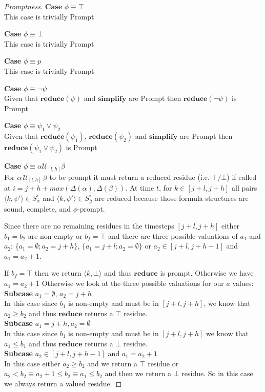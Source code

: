 \documentclass[10pt,a4paper]{article}
\newcommand{\rp}[2]{\ensuremath{\langle #1, #2 \rangle}}
\begin{document}
\begin{proof}[Promptness]

\noindent \textbf{Case} $\phi \equiv \top$ \\
This case is trivially Prompt

\noindent \textbf{Case} $\phi \equiv \bot$ \\
This case is trivially Prompt

\noindent \textbf{Case} $\phi \equiv p$ \\
This case is trivially Prompt

\noindent \textbf{Case} $\phi \equiv \neg \psi$ \\
Given that $\mathbf{reduce}(\psi)$ and $\mathbf{simplify}$ are Prompt then $\mathbf{reduce}(\neg \psi)$ is Prompt

\noindent \textbf{Case} $\phi \equiv \psi_1 \vee \psi_2$ \\
Given that $\mathbf{reduce}(\psi_1)$, $\mathbf{reduce}(\psi_2)$ and $\mathbf{simplify}$ are Prompt then $\mathbf{reduce}(\psi_1 \vee \psi_2)$ is Prompt

\noindent \textbf{Case} $\phi \equiv \alpha \mathcal{U}_{[l,h]} \beta$ \\
For $\alpha\, \mathcal{U}_{[l,h]}\, \beta$ to be prompt it must return a reduced residue (i.e. $\top/\bot$) if called at $i = j + h + max(\Delta(\alpha),\Delta(\beta))$. At time $t$, for $k \in [j+l,j+h]$ all pairs $\rp{k}{\psi'} \in S^i_{\alpha}$ and $\rp{k}{\psi'} \in S^i_\beta$ are reduced because those formula structures are sound, complete, and $\phi$-prompt.

Since there are no remaining residues in the timesteps $[j+l,j+h]$ either $b_1 = b_2$ are non-empty or $b_f = \top$ and there are three possible valuations of $a_1$ and $a_2$: \{$a_1 = \emptyset; a_2 = j+h\}$, $\{a_1 = j+l; a_2 = \emptyset\}$ or $a_2 \in [j+l,j+h-1]$ and $a_1 = a_2 + 1$.

If $b_f = \top$ then we return $\rp{k}{\bot}$ and thus $\mathbf{reduce}$ is prompt. Otherwise we have $a_1 = a_2+1$
Otherwise we look at the three possible valuations for our $a$ values: \\
\textbf{Subcase} $a_1 = \emptyset$, $a_2 = j+h$ \\
In this case since $b_1$ is non-empty and must be in $[j+l,j+h]$, we know that $a_2 \geq b_2$ and thus $\mathbf{reduce}$ returns a $\top$ residue. \\
\textbf{Subcase} $a_1 = j+h, a_2 = \emptyset$ \\
In this case since $b_1$ is non-empty and must be in $[j+l,j+h]$ we know that $a_1 \leq b_1$ and thus $\mathbf{reduce}$ returns a $\bot$ residue. \\
\textbf{Subcase} $a_2 \in [j+l,j+h-1]$ and $a_1 = a_2 + 1$ \\
In this case either $a_2 \geq b_2$ and we return a $\top$ residue or $a_2 < b_2 \equiv a_2 + 1 \leq b_2 \equiv a_1 \leq b_2$ and then we return a $\bot$ residue. So in this case we always return a valued residue.
\end{proof}
\end{document}
